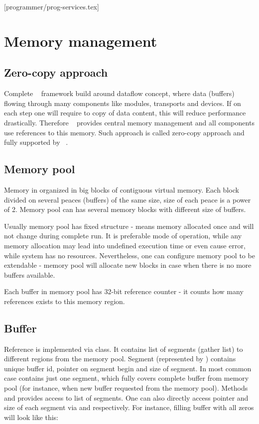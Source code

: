 [programmer/prog-services.tex]

\section{Memory management}

\subsection{Zero-copy approach}

Complete \dabc~ framework build around dataflow concept, where data (buffers) 
flowing through many components like modules, transports and devices. 
If on each step one will require to copy of data content, this will reduce 
performance drastically. Therefore \dabc~ provides central memory management
and all components use references to this memory. 
Such approach is called zero-copy approach and fully supported by \dabc~.


\subsection{Memory pool}

Memory in  organized in big blocks of contiguous virtual memory.
Each block divided on several peaces (buffers) of the same size, size of each peace is a power of 2.
Memory pool can has several memory blocks with different size of buffers.

Usually memory pool has fixed structure - means memory allocated once and will not
change during complete run. It is preferable mode of operation, while any 
memory allocation may lead into undefined execution time or even cause error, while
system has no resources. Nevertheless, one can configure memory pool to be extendable -  
memory pool will allocate new blocks in case when there is no more buffers available.   

Each buffer in memory pool has 32-bit reference counter - it counts how many references
exists to this memory region.   


\subsection{Buffer}

Reference is implemented via  class. 
It contains list of segments (gather list) to different regions from the memory pool.
Segment (represented by ) contains unique buffer id, pointer
on segment begin and size of segment. In most common case  contains 
just one segment, which fully covers complete buffer from memory pool (for instance, 
when new buffer requested from the memory pool). Methods  and
 provides access to list of segments. One can also directly access
pointer and size of each segment via  and 
respectively. For instance, filling buffer with all zeros will look like this:  
 
